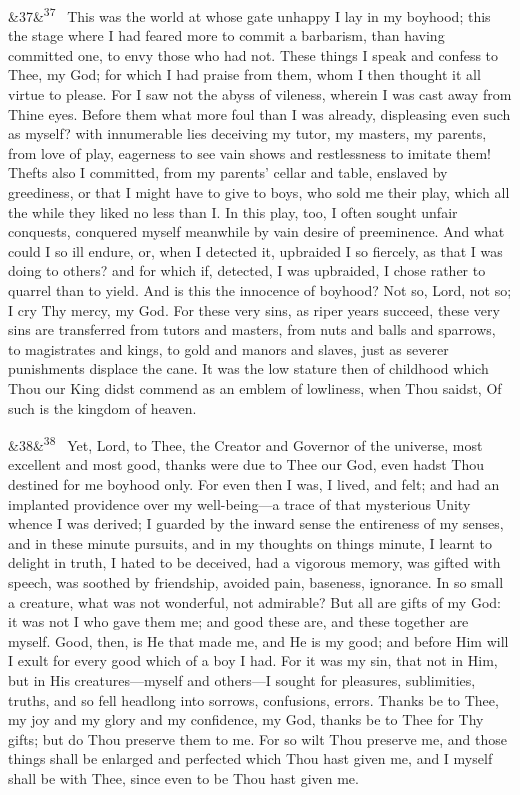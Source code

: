 \documentclass[12pt]{article}
\newcommand{\para}[1][]{\par\noindent\ifx&#1&\else\textsuperscript{\footnotesize #1}~\fi}
\begin{document}
\para[37] This was the world at whose gate unhappy I lay in my boyhood; this the stage where I had feared more to commit a barbarism, than having committed one, to envy those who had not. These things I speak and confess to Thee, my God; for which I had praise from them, whom I then thought it all virtue to please. For I saw not the abyss of vileness, wherein I was cast away from Thine eyes. Before them what more foul than I was already, displeasing even such as myself? with innumerable lies deceiving my tutor, my masters, my parents, from love of play, eagerness to see vain shows and restlessness to imitate them! Thefts also I committed, from my parents' cellar and table, enslaved by greediness, or that I might have to give to boys, who sold me their play, which all the while they liked no less than I. In this play, too, I often sought unfair conquests, conquered myself meanwhile by vain desire of preeminence. And what could I so ill endure, or, when I detected it, upbraided I so fiercely, as that I was doing to others? and for which if, detected, I was upbraided, I chose rather to quarrel than to yield. And is this the innocence of boyhood? Not so, Lord, not so; I cry Thy mercy, my God. For these very sins, as riper years succeed, these very sins are transferred from tutors and masters, from nuts and balls and sparrows, to magistrates and kings, to gold and manors and slaves, just as severer punishments displace the cane. It was the low stature then of childhood which Thou our King didst commend as an emblem of lowliness, when Thou saidst, Of such is the kingdom of heaven.

\para[38] Yet, Lord, to Thee, the Creator and Governor of the universe, most excellent and most good, thanks were due to Thee our God, even hadst Thou destined for me boyhood only. For even then I was, I lived, and felt; and had an implanted providence over my well-being---a trace of that mysterious Unity whence I was derived; I guarded by the inward sense the entireness of my senses, and in these minute pursuits, and in my thoughts on things minute, I learnt to delight in truth, I hated to be deceived, had a vigorous memory, was gifted with speech, was soothed by friendship, avoided pain, baseness, ignorance. In so small a creature, what was not wonderful, not admirable? But all are gifts of my God: it was not I who gave them me; and good these are, and these together are myself. Good, then, is He that made me, and He is my good; and before Him will I exult for every good which of a boy I had. For it was my sin, that not in Him, but in His creatures---myself and others---I sought for pleasures, sublimities, truths, and so fell headlong into sorrows, confusions, errors. Thanks be to Thee, my joy and my glory and my confidence, my God, thanks be to Thee for Thy gifts; but do Thou preserve them to me. For so wilt Thou preserve me, and those things shall be enlarged and perfected which Thou hast given me, and I myself shall be with Thee, since even to be Thou hast given me.
\end{document}
